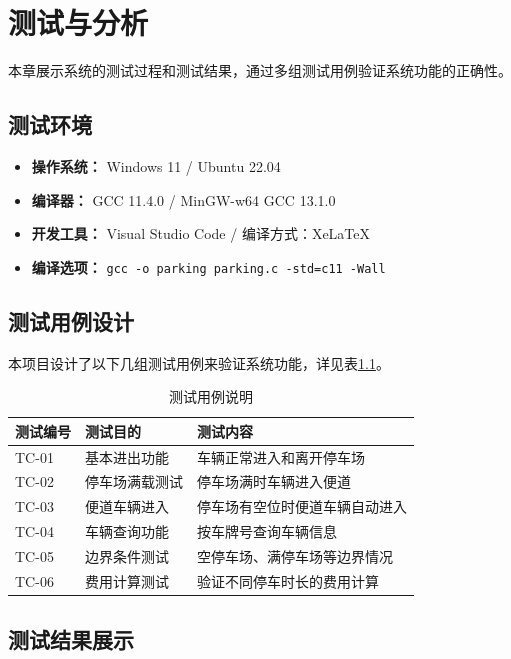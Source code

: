 \documentclass[a4paper,12pt,twoside]{ctexrep}
\begin{document}
\cleardoublepage
\chapter{测试与分析}

本章展示系统的测试过程和测试结果，通过多组测试用例验证系统功能的正确性。

\section{测试环境}

\begin{itemize}
  \item \textbf{操作系统：} Windows 11 / Ubuntu 22.04
  \item \textbf{编译器：} GCC 11.4.0 / MinGW-w64 GCC 13.1.0
  \item \textbf{开发工具：} Visual Studio Code / 编译方式：XeLaTeX
  \item \textbf{编译选项：} \texttt{gcc -o parking parking.c -std=c11 -Wall}
\end{itemize}

\section{测试用例设计}

本项目设计了以下几组测试用例来验证系统功能，详见表\ref{tab:testcase}。

\begin{table}[htbp]
  \centering
  \caption{测试用例说明}
  \label{tab:testcase}
  \begin{tabular}{lll}
    \toprule
    \textbf{测试编号} & \textbf{测试目的} & \textbf{测试内容} \\
    \midrule
    TC-01 & 基本进出功能 & 车辆正常进入和离开停车场 \\
    TC-02 & 停车场满载测试 & 停车场满时车辆进入便道 \\
    TC-03 & 便道车辆进入 & 停车场有空位时便道车辆自动进入 \\
    TC-04 & 车辆查询功能 & 按车牌号查询车辆信息 \\
    TC-05 & 边界条件测试 & 空停车场、满停车场等边界情况 \\
    TC-06 & 费用计算测试 & 验证不同停车时长的费用计算 \\
    \bottomrule
  \end{tabular}
\end{table}

\section{测试结果展示}
\end{document}
